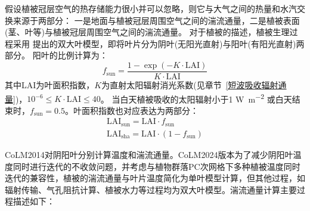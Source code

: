 假设植被冠层空气的热存储能力很小并可以忽略，则它与大气之间的热量和水汽交换来源于两部分：
一是地面与植被冠层周围空气之间的湍流通量，二是植被表面(茎、叶等)与植被冠层周围空气之间的湍流通量。
对于植被的描述，植被生理过程采用 \citet{dai2004two}提出的双大叶模型，即将叶片分为阴叶(无阳光直射)与阳叶(有阳光直射)两部分。
阳叶的比例计算为：
\begin{equation}
  f_{\mathrm{sun}}=\frac{1-\exp (-K \cdot \text {LAI})}{K \cdot \text {LAI}}
\end{equation}
其中LAI为叶面积指数，$K$为直射太阳辐射消光系数(见章节~\ref{短波吸收辐射通量})，${10}^{-6}\leqslant K \cdot \text {LAI}\le40$。
当白天植被吸收的太阳辐射小于1 \unit{W.m^{-2}} 或白天结束时，$f_{\mathrm{sun}}=0.5$。叶面积指数也对应表达为两部分：
\begin{equation}
  \begin{array}{c} \text {LAI}_{\mathrm{sun}}= \text {LAI} \cdot f_{\mathrm{sun}} \\ \text {LAI}_{\mathrm{sha}}=\text {LAI} \cdot \left(1-f_{\mathrm{sun}}\right)\end{array}
\end{equation}

CoLM2014对阴阳叶分别计算温度和湍流通量。CoLM2024版本为了减少阴阳叶温度同时进行迭代的不收敛问题，并考虑与植物群落PC次网格下多种植被温度同时迭代的兼容性，植被的湍流通量与叶片温度简化为单叶模型计算，但其他过程，如辐射传输、气孔阻抗计算、植被水力等过程均为双大叶模型。湍流通量计算主要过程描述如下：


